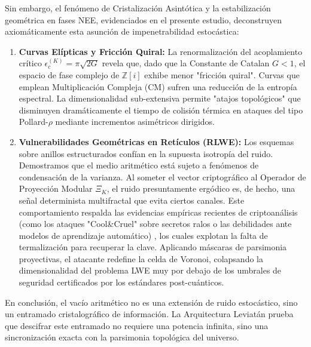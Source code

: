 \documentclass[12pt, a4paper]{article}
\theoremstyle{plain}
\theoremstyle{definition}
\theoremstyle{remark}
\newcommand{\Z}{\mathbb{Z}}
\begin{document}
Sin embargo, el fenómeno de Cristalización Asintótica y la estabilización geométrica en fases NEE, evidenciados en el presente estudio, deconstruyen axiomáticamente esta asunción de impenetrabilidad estocástica:

\begin{enumerate}[label=(\roman*)]
    \item \textbf{Curvas Elípticas y Fricción Quiral:} La renormalización del acoplamiento crítico $\epsilon_c^{(K)} = \pi\sqrt{2G}$ revela que, dado que la Constante de Catalan $G < 1$, el espacio de fase complejo de $\Z[i]$ exhibe menor "fricción quiral". Curvas que emplean Multiplicación Compleja (CM) sufren una reducción de la entropía espectral. La dimensionalidad sub-extensiva permite "atajos topológicos" que disminuyen dramáticamente el tiempo de colisión térmica en ataques del tipo Pollard-$\rho$ mediante incrementos asimétricos dirigidos.
    
    \item \textbf{Vulnerabilidades Geométricas en Retículos (RLWE):} Los esquemas sobre anillos estructurados confían en la supuesta isotropía del ruido. Demostramos que el medio aritmético está sujeto a fenómenos de condensación de la varianza. Al someter el vector criptográfico al Operador de Proyección Modular $\Xi_K$, el ruido presuntamente ergódico es, de hecho, una señal determinista multifractal que evita ciertos canales. Este comportamiento respalda las evidencias empíricas recientes de criptoanálisis (como los ataques "Cool\&Cruel" sobre secretos ralos o las debilidades ante modelos de aprendizaje automático) \cite{Wenger2024}, los cuales explotan la falta de termalización para recuperar la clave. Aplicando máscaras de parsimonia proyectivas, el atacante redefine la celda de Voronoi, colapsando la dimensionalidad del problema LWE muy por debajo de los umbrales de seguridad certificados por los estándares post-cuánticos.
\end{enumerate}

En conclusión, el vacío aritmético no es una extensión de ruido estocástico, sino un entramado cristalográfico de información. La Arquitectura Leviatán prueba que descifrar este entramado no requiere una potencia infinita, sino una sincronización exacta con la parsimonia topológica del universo.

\appendix
\end{document}
